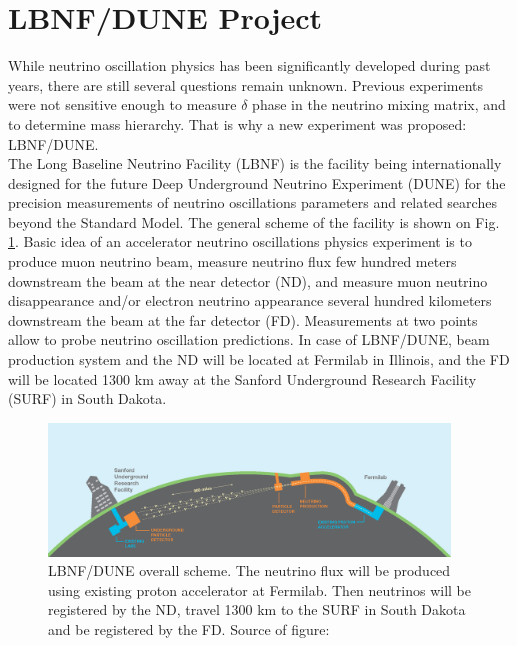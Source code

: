 
\section{LBNF/DUNE Project}

While neutrino oscillation physics has been significantly developed during past years, there are still several questions remain unknown. Previous experiments were not sensitive enough to measure $\delta$ phase in the neutrino mixing matrix, and to determine mass hierarchy. That is why a new experiment was proposed: LBNF/DUNE.\\

The Long Baseline Neutrino Facility (LBNF) is the facility being internationally designed for the future Deep Underground Neutrino Experiment (DUNE) for the precision measurements of neutrino oscillations parameters and related searches beyond the Standard Model. The general scheme of the facility is shown on Fig. \ref{fig:LBNF_overallScheme}. Basic idea of an accelerator neutrino oscillations physics experiment is to produce muon neutrino beam, measure neutrino flux few hundred meters downstream the beam at the near detector (ND), and measure muon neutrino disappearance and/or electron neutrino appearance several hundred kilometers downstream the beam at the far detector (FD). Measurements at two points allow to probe neutrino oscillation predictions. In case of LBNF/DUNE, beam production system and the ND will be located at Fermilab in Illinois, and the FD will be located 1300 km away at the Sanford Underground Research Facility (SURF) in South Dakota. \\

\begin{figure}
\caption{LBNF/DUNE overall scheme. The neutrino flux will be produced using existing proton accelerator at Fermilab. Then neutrinos will be registered by the ND, travel 1300 km to the SURF in South Dakota and be registered by the FD. Source of figure: \cite{ref_LBNFweb} }
\label{fig:LBNF_overallScheme}
\centering
\includegraphics[width=0.95\textwidth, keepaspectratio=true]{figs/LBNF_overallScheme.png} 
\end{figure}

